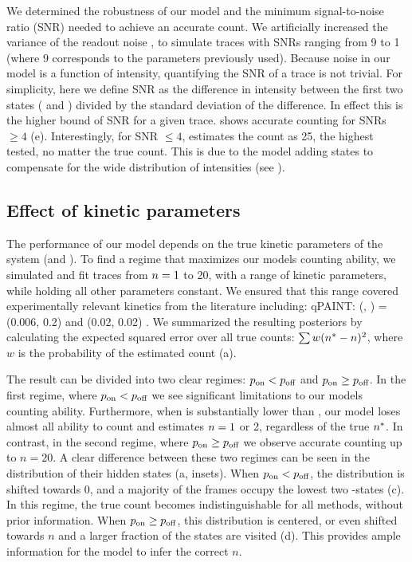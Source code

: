 We determined the robustness of our model and the minimum signal-to-noise ratio 
(SNR) needed to achieve an accurate count.
	We artificially increased the variance of the readout noise \camvar, 
	to simulate traces with SNRs ranging from 9 to 1 (where 9 
	corresponds to the parameters previously used).
	Because noise in our model is a function of intensity, quantifying the SNR of a trace 
	is not trivial. 
	For simplicity, here we define SNR as the difference in intensity between 
	the first two states ( and ) divided by the standard deviation of the difference. 
	In effect this is the higher bound of SNR for a given trace. 
	\ours shows accurate counting for SNRs $\geq 4$ (e). 
	Interestingly, for  SNR $\leq 4$, \ours estimates the count as 25, 
	the highest \n tested, no matter the true count. 
	This is due to the model adding states to compensate for the wide distribution of intensities  
	(see ).

\subsection{Effect of kinetic parameters}
The performance of our model depends on the true kinetic parameters of the system (\pon and \poff).
%
	To find a regime that maximizes our models counting ability, we simulated and fit traces 
	from $n=1$ to 20, with a range of kinetic parameters, 
	while holding all other parameters constant.
	We ensured that this range covered experimentally relevant kinetics from the literature including:
	qPAINT: (\pon, \poff) = (0.006, 0.2) \cite{jungmann_2016} and \lbfcs (0.02, 0.02) \cite{stein_2021}. 
	We summarized the resulting posteriors by calculating the expected squared error over all true counts: 
	$\sum w(n^* - n)^2$, where $w$ is the probability of the estimated count \n 
	(a).

The result can be divided into two clear regimes: $p_\text{on} < p_\text{off}$ and $p_\text{on} \geq p_\text{off}$.
	In the first regime, where $p_\text{on} < p_\text{off}$ we see significant limitations to our models counting ability.
	Furthermore, when \pon is substantially lower than \poff, our model loses almost 
	all ability to count and estimates $n=1$ or 2, regardless of the true $n^*$.
	In contrast, in the second regime, where $p_\text{on} \geq p_\text{off}$ we observe 
	accurate counting up to $n=20$.
	A clear difference between these two regimes can be seen in the distribution 
	of their hidden states \z{} (a, insets).
	When $p_\text{on} < p_\text{off}$, the distribution is shifted towards 0, and a majority 
	of the frames occupy the lowest two \z{}-states (c). 
	In this regime, the true count becomes indistinguishable for all methods, without prior information. 
	When $p_\text{on} \geq p_\text{off}$, this distribution is centered, or even shifted towards $n$ 
	and a larger fraction of the states are visited (d). 
	This provides ample information for the model to infer the correct $n$.
	
